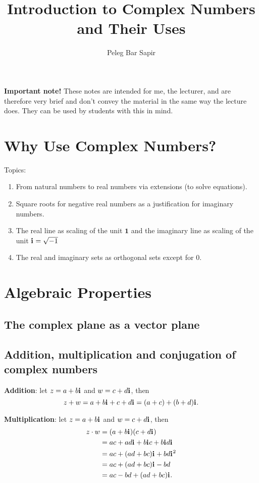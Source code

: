 \documentclass{article}
\title{Introduction to Complex Numbers and Their Uses}
\author{Peleg Bar Sapir}
\newcommand{\iu}{\mathbf{i}\mkern1mu}
\begin{document}
\maketitle

\begin{tcolorbox}[colback=black!2, colframe=black]
	\textbf{Important note!} These notes are intended for me, the lecturer, and are therefore very brief and don't convey the material in the same way the lecture does. They can be used by students with this in mind.
\end{tcolorbox}


\section{Why Use Complex Numbers?}
Topics:
\begin{enumerate}
	\item From natural numbers to real numbers via extensions (to solve equations).
	\item Square roots for negative real numbers as a justification for imaginary numbers.
	\item The real line as scaling of the unit $\mathbf{1}$ and the imaginary line as scaling of the unit $\iu=\sqrt{-1}$
	\item The real and imaginary sets as orthogonal sets except for $0$.
\end{enumerate}

\section{Algebraic Properties}
\subsection{The complex plane as a vector plane}
\subsection{Addition, multiplication and conjugation of complex numbers}
\textbf{Addition}: let $z=a + b\iu$ and $w=c + d\iu$, then
\begin{equation}
	z+w = a+b\iu + c+d\iu = (a+c) + (b+d)\iu.
	\label{eq:addition_complex}
\end{equation}

\textbf{Multiplication}: let $z=a + b\iu$ and $w=c + d\iu$, then
\begin{equation}
	\begin{aligned}
		z \cdot w & = (a+b\iu)(c+d\iu)                \\
		          & = ac + ad\iu + b\iu c + b\iu d\iu \\
		          & = ac + (ad+bc)\iu + bd\iu^{2}     \\
		          & = ac + (ad+bc)\iu - bd            \\
		          & = ac-bd + (ad+bc)\iu.
	\end{aligned}
	\label{eq:multiplication_complex}
\end{equation}
\end{document}
